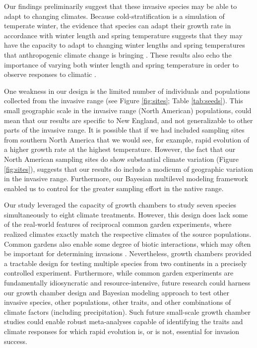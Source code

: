 \documentclass[12pt]{article}\usepackage[]{graphicx}\usepackage[]{color}
\begin{document}
	Our findings preliminarily suggest that these invasive species may be able to adapt to changing climates. Because cold-stratification is a simulation of temperate winter, the evidence that species can adapt their growth rate in accordance with winter length and spring temperature suggests that they may have the capacity to adapt to changing winter lengths and spring temperatures that anthropogenic climate change is bringing \parencite{IPCC2015}. These results also echo the  importance of varying both winter length and spring temperature in order to observe responses to climatic \parencite[e.g.,][]{Bernareggi2016}. 
	
	One weakness in our design is the limited number of individuals and populations collected from the invasive range (see Figure \ref{fig:sites}; Table \ref{tab:seeds}). This small geographic scale in the invasive range (North American) populations, could mean that our results are specific to New England, and not generalizable to other parts of the invasive range. It is possible that if we had included sampling sites from southern North America that we would see, for example,  rapid evolution of a higher growth rate at the highest temperature. However, the fact that our North American sampling sites do show substantial climate variation (Figure \ref{fig:sites}), suggests that our results do include a modicum of geographic variation in the invasive range. Furthermore, our Bayesian multilevel modeling framework enabled us to control for the greater sampling effort in the native range. 
	
	Our study leveraged the capacity of growth chambers to study seven species simultaneously to eight climate treatments. However, this design does lack some of the real-world features of reciprocal common garden experiments, where realized climates exactly match the respective climates of the source populations. Common gardens also enable some degree of biotic interactions, which may often be important for determining invasions \parencite{Germain2018,Blois2013}.  Nevertheless, growth chambers provided a tractable design for testing multiple species from two continents in a precisely controlled experiment. Furthermore, while common garden experiments are fundamentally idiosyncratic and resource-intensive, future research could harness our growth chamber design and Bayesian modeling approach to test other invasive species, other populations, other traits, and other combinations of climate factors (including precipitation). Such future small-scale growth chamber studies could enable robust meta-analyses capable of identifying the traits and climate responses for which rapid evolution is, or is not, essential for invasion success. 
	
\end{document}
